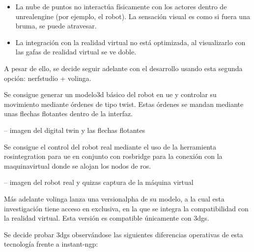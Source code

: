 \documentclass[a4paper, 12pt, spanish, twoside]{article}
\begin{document}
\begin{itemize} 

\item La nube de puntos no interactúa físicamente con los \gls{actores} dentro de \gls{unrealengine} (por ejemplo, el robot). La sensación visual es como si fuera una bruma, se puede atravesar. 

\item La integración con la realidad virtual no está optimizada, al visualizarlo con las gafas de realidad virtual se ve doble. 

\end{itemize} 

A pesar de ello, se decide seguir adelante con el desarrollo usando esta segunda opción: \gls{nerfstudio}  + \gls{volinga}. 

Se consigue generar un \gls{modelo3d} básico del robot en \acrshort{ue} y controlar su movimiento mediante órdenes de tipo \gls{twist}. Estas órdenes se mandan mediante unas flechas flotantes dentro de la interfaz. 

-- imagen del digital twin y las flechas flotantes 

Se consigue el control del robot real mediante el uso de la herramienta \gls{rosintegration} para \acrshort{ue} en conjunto con \gls{rosbridge} para la conexión con la \gls{maquinavirtual} donde se alojan los nodos de \acrshort{ros}. 

-- imagen del robot real y quizas captura de la máquina virtual 

Más adelante \gls{volinga} lanza una \gls{versionalpha} de su modelo, a la cual esta investigación tiene acceso en exclusiva, en la que se integra la compatibilidad con la realidad virtual. Esta versión es compatible únicamente con \acrshort{3dgs}. 

Se decide probar \acrshort{3dgs} observándose las siguientes diferencias operativas de esta tecnología frente a \gls{instant-ngp}: 
\end{document}
